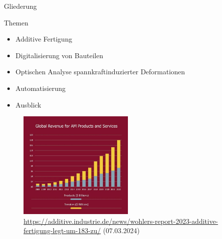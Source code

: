 \documentclass[../slides.tex]{subfiles}
\begin{document}
\begin{frame}{Gliederung}
  \begin{minipage}[t]{.3\textwidth}
    \begin{block}{Themen}
      \begin{itemize}
          \item Additive Fertigung
          \item Digitalisierung von Bauteilen
          \item Optischen Analyse spannkraftinduzierter Deformationen
          \item Automatisierung 
          \item Ausblick
      \end{itemize}
    \end{block}
  \end{minipage}
  \hfill
  \begin{minipage}[t]{.69\textwidth}
    \begin{figure}[]
      \includegraphics[height=150pt]{img_niklas/Picture3-1-scaled_0FB63A00-D319-40EF-A648-9739A68215D6.jpg}
      \caption{{\url{https://additive.industrie.de/news/wohlers-report-2023-additive-fertigung-legt-um-183-zu/} (07.03.2024)\\}}
      \label{fig:globalRev}
    \end{figure}
  \end{minipage}
\end{frame}
\end{document}
